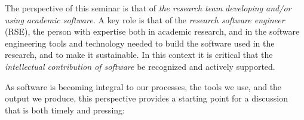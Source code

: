 \documentclass[a4paper,UKenglish]{dagman}
\begin{document}
The perspective of this seminar is that of \emph{the research team developing and/or using academic software.} 
A key role is that of the \emph{research software engineer} (RSE), the person with expertise both in academic research, and in the software engineering tools and technology needed to build the software used in the research, and to make it sustainable. 
In this context it is critical that the \emph{intellectual contribution of software} be recognized and actively supported.

As software is becoming integral to our processes, the tools we use, and the output we produce, this perspective provides a starting point for a discussion that is both timely and pressing:
\end{document}
